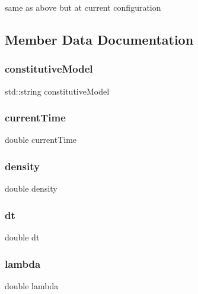 same as above but at current configuration 

\subsection{Member Data Documentation}
\mbox{\label{class_residual_a83be21658f82b0682f84f5dc9f10190f}} 
\subsubsection{\texorpdfstring{constitutive\+Model}{constitutiveModel}}
{\footnotesize\ttfamily std\+::string constitutive\+Model}

\mbox{\label{class_residual_a272038ad264893a568c808f13d818b17}} 
\subsubsection{\texorpdfstring{current\+Time}{currentTime}}
{\footnotesize\ttfamily double current\+Time}

\mbox{\label{class_residual_a6f8c052f8417728038991f7f2826d38d}} 
\subsubsection{\texorpdfstring{density}{density}}
{\footnotesize\ttfamily double density}

\mbox{\label{class_residual_a03e28be41881b703c836edbfe9b51b17}} 
\subsubsection{\texorpdfstring{dt}{dt}}
{\footnotesize\ttfamily double dt}

\mbox{\label{class_residual_a3db359547eed8cfd48ca821d95f577af}} 
\subsubsection{\texorpdfstring{lambda}{lambda}}
{\footnotesize\ttfamily double lambda}

